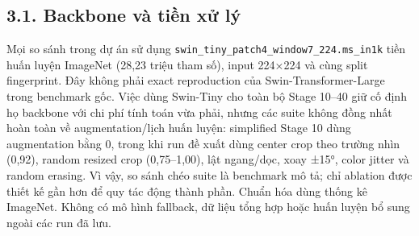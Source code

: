 \documentclass[
  10pt,
  a4paper,
  twocolumn]{article}
\begin{document}
\subsection{3.1. Backbone và tiền xử
lý}\label{backbone-vuxe0-tiux1ec1n-xux1eed-luxfd}

Mọi so sánh trong dự án sử dụng
\texttt{swin\_tiny\_patch4\_window7\_224.ms\_in1k} tiền huấn luyện
ImageNet (28,23 triệu tham số), input 224×224 và cùng split fingerprint.
Đây không phải exact reproduction của Swin-Transformer-Large trong
benchmark gốc. Việc dùng Swin-Tiny cho toàn bộ Stage 10--40 giữ cố định
họ backbone với chi phí tính toán vừa phải, nhưng các suite không đồng
nhất hoàn toàn về augmentation/lịch huấn luyện: simplified Stage 10 dùng
augmentation bằng 0, trong khi run đề xuất dùng center crop theo trường
nhìn (0,92), random resized crop (0,75--1,00), lật ngang/dọc, xoay ±15°,
color jitter và random erasing. Vì vậy, so sánh chéo suite là benchmark
mô tả; chỉ ablation được thiết kế gần hơn để quy tác động thành phần.
Chuẩn hóa dùng thống kê ImageNet. Không có mô hình fallback, dữ liệu
tổng hợp hoặc huấn luyện bổ sung ngoài các run đã lưu.

\begin{table}[htbp]
\centering
\caption{Cấu hình chi tiết của mô hình Swin-Tiny đề xuất.}
\label{tab:table3}
\vspace{2pt}
\end{table}
\end{document}
